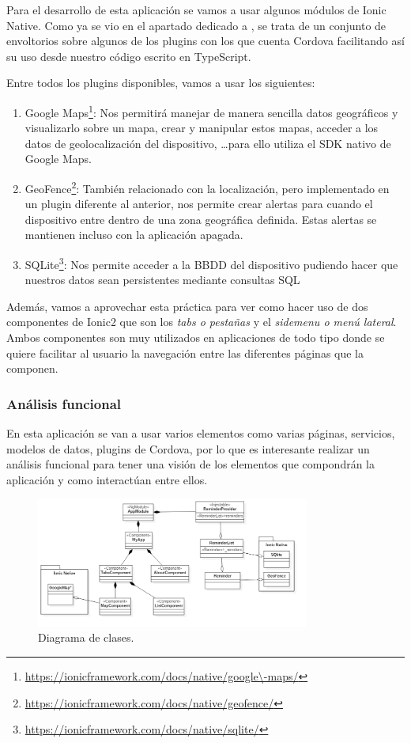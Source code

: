 Para el desarrollo de esta aplicación se vamos a usar algunos módulos de Ionic Native. Como ya se vio en el apartado dedicado a , se trata de un conjunto de envoltorios sobre algunos de los plugins con los que cuenta Cordova facilitando así su uso desde nuestro código escrito en TypeScript.

Entre todos los plugins disponibles, vamos a usar los siguientes:

\begin{enumerate}
  \item Google Maps\footnote{\url{https://ionicframework.com/docs/native/google\-maps/}}: Nos permitirá manejar de manera sencilla datos geográficos y visualizarlo sobre un mapa, crear y manipular estos mapas, acceder a los datos de geolocalización del dispositivo, \ldots para ello utiliza el SDK nativo de Google Maps.
  \item GeoFence\footnote{\url{https://ionicframework.com/docs/native/geofence/}}: También relacionado con la localización, pero implementado en un plugin diferente al anterior, nos permite crear alertas para cuando el dispositivo entre dentro de una zona geográfica definida. Estas alertas se mantienen incluso con la aplicación apagada.
  \item SQLite\footnote{\url{https://ionicframework.com/docs/native/sqlite/}}: Nos permite acceder a la \gls{BBDD} del dispositivo pudiendo hacer que nuestros datos sean persistentes mediante consultas \gls{SQL}
\end{enumerate}

Además, vamos a aprovechar esta práctica para ver como hacer uso de dos componentes de Ionic2 que son los \emph{tabs o pestañas} y el \emph{sidemenu o menú lateral}. Ambos componentes son muy utilizados en aplicaciones de todo tipo donde se quiere facilitar al usuario la navegación entre las diferentes páginas que la componen.

\subsubsection{Análisis funcional}

En esta aplicación se van a usar varios elementos como varias páginas, servicios, modelos de datos, plugins de Cordova, \ldot por lo que es interesante realizar un análisis funcional para tener una visión de los elementos que compondrán la aplicación y como interactúan entre ellos.

\begin{figure}[H]
\centering
    \centering
        \includegraphics[width=0.8\textwidth]{Figures/ch2/ReminderMap/class_diagram}
    \caption{Diagrama de clases.}
\end{figure}

